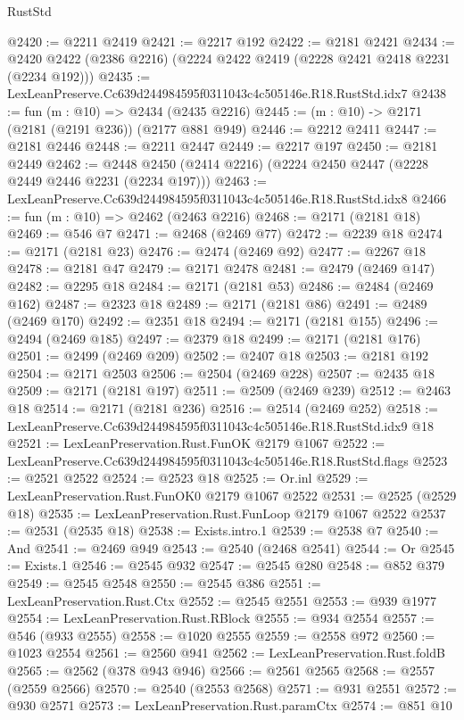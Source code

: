 \begin{lexlean}{RustStd}
\begin{coremodule}
@2420 := @2211 @2419
@2421 := @2217 @192
@2422 := @2181 @2421
@2434 := @2420 @2422 (@2386 @2216) (@2224 @2422 @2419 (@2228 @2421 @2418 @2231 (@2234 @192)))
@2435 := LexLeanPreserve.Cc639d244984595f0311043c4c505146e.R18.RustStd.idx7
@2438 := fun (m : @10) => @2434 (@2435 @2216)
@2445 := (m : @10) -> @2171 (@2181 (@2191 @236)) (@2177 @881 @949)
@2446 := @2212 @2411
@2447 := @2181 @2446
@2448 := @2211 @2447
@2449 := @2217 @197
@2450 := @2181 @2449
@2462 := @2448 @2450 (@2414 @2216) (@2224 @2450 @2447 (@2228 @2449 @2446 @2231 (@2234 @197)))
@2463 := LexLeanPreserve.Cc639d244984595f0311043c4c505146e.R18.RustStd.idx8
@2466 := fun (m : @10) => @2462 (@2463 @2216)
@2468 := @2171 (@2181 @18)
@2469 := @546 @7
@2471 := @2468 (@2469 @77)
@2472 := @2239 @18
@2474 := @2171 (@2181 @23)
@2476 := @2474 (@2469 @92)
@2477 := @2267 @18
@2478 := @2181 @47
@2479 := @2171 @2478
@2481 := @2479 (@2469 @147)
@2482 := @2295 @18
@2484 := @2171 (@2181 @53)
@2486 := @2484 (@2469 @162)
@2487 := @2323 @18
@2489 := @2171 (@2181 @86)
@2491 := @2489 (@2469 @170)
@2492 := @2351 @18
@2494 := @2171 (@2181 @155)
@2496 := @2494 (@2469 @185)
@2497 := @2379 @18
@2499 := @2171 (@2181 @176)
@2501 := @2499 (@2469 @209)
@2502 := @2407 @18
@2503 := @2181 @192
@2504 := @2171 @2503
@2506 := @2504 (@2469 @228)
@2507 := @2435 @18
@2509 := @2171 (@2181 @197)
@2511 := @2509 (@2469 @239)
@2512 := @2463 @18
@2514 := @2171 (@2181 @236)
@2516 := @2514 (@2469 @252)
@2518 := LexLeanPreserve.Cc639d244984595f0311043c4c505146e.R18.RustStd.idx9 @18
@2521 := LexLeanPreservation.Rust.FunOK @2179 @1067
@2522 := LexLeanPreserve.Cc639d244984595f0311043c4c505146e.R18.RustStd.flags
@2523 := @2521 @2522
@2524 := @2523 @18
@2525 := Or.inl
@2529 := LexLeanPreservation.Rust.FunOK0 @2179 @1067 @2522
@2531 := @2525 (@2529 @18)
@2535 := LexLeanPreservation.Rust.FunLoop @2179 @1067 @2522
@2537 := @2531 (@2535 @18)
@2538 := Exists.intro.{1}
@2539 := @2538 @7
@2540 := And
@2541 := @2469 @949
@2543 := @2540 (@2468 @2541)
@2544 := Or
@2545 := Exists.{1}
@2546 := @2545 @932
@2547 := @2545 @280
@2548 := @852 @379
@2549 := @2545 @2548
@2550 := @2545 @386
@2551 := LexLeanPreservation.Rust.Ctx
@2552 := @2545 @2551
@2553 := @939 @1977
@2554 := LexLeanPreservation.Rust.RBlock
@2555 := @934 @2554
@2557 := @546 (@933 @2555)
@2558 := @1020 @2555
@2559 := @2558 @972
@2560 := @1023 @2554
@2561 := @2560 @941
@2562 := LexLeanPreservation.Rust.foldB
@2565 := @2562 (@378 @943 @946)
@2566 := @2561 @2565
@2568 := @2557 (@2559 @2566)
@2570 := @2540 (@2553 @2568)
@2571 := @931 @2551
@2572 := @930 @2571
@2573 := LexLeanPreservation.Rust.paramCtx
@2574 := @851 @10

\end{coremodule}
\end{lexlean}

